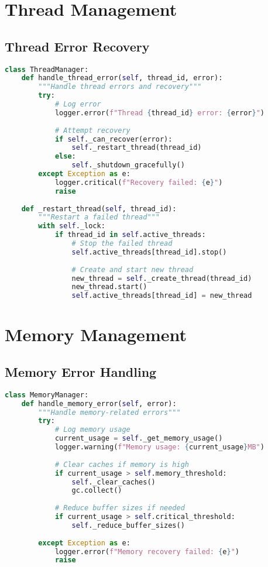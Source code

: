 \section{Thread Management}

\subsection{Thread Error Recovery}
\begin{lstlisting}[language=Python]
class ThreadManager:
    def handle_thread_error(self, thread_id, error):
        """Handle thread errors and recovery"""
        try:
            # Log error
            logger.error(f"Thread {thread_id} error: {error}")
            
            # Attempt recovery
            if self._can_recover(error):
                self._restart_thread(thread_id)
            else:
                self._shutdown_gracefully()
        except Exception as e:
            logger.critical(f"Recovery failed: {e}")
            raise
            
    def _restart_thread(self, thread_id):
        """Restart a failed thread"""
        with self._lock:
            if thread_id in self.active_threads:
                # Stop the failed thread
                self.active_threads[thread_id].stop()
                
                # Create and start new thread
                new_thread = self._create_thread(thread_id)
                new_thread.start()
                self.active_threads[thread_id] = new_thread
\end{lstlisting}

\section{Memory Management}

\subsection{Memory Error Handling}
\begin{lstlisting}[language=Python]
class MemoryManager:
    def handle_memory_error(self, error):
        """Handle memory-related errors"""
        try:
            # Log memory usage
            current_usage = self._get_memory_usage()
            logger.warning(f"Memory usage: {current_usage}MB")
            
            # Clear caches if memory is high
            if current_usage > self.memory_threshold:
                self._clear_caches()
                gc.collect()
                
            # Reduce buffer sizes if needed
            if current_usage > self.critical_threshold:
                self._reduce_buffer_sizes()
                
        except Exception as e:
            logger.error(f"Memory recovery failed: {e}")
            raise
\end{lstlisting}

